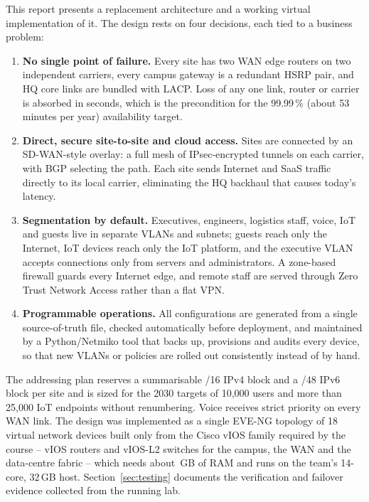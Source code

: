 \documentclass[11pt,a4paper]{article}
\newcounter{evid}
\begin{document}
This report presents a replacement architecture and a working virtual implementation of it. The design rests on four decisions, each tied to a business problem:

\begin{enumerate}
\item \textbf{No single point of failure.} Every site has two WAN edge routers on two independent carriers, every campus gateway is a redundant HSRP pair, and HQ core links are bundled with LACP. Loss of any one link, router or carrier is absorbed in seconds, which is the precondition for the 99.99\,\% (about 53 minutes per year) availability target.
\item \textbf{Direct, secure site-to-site and cloud access.} Sites are connected by an SD-WAN-style overlay: a full mesh of IPsec-encrypted tunnels on each carrier, with BGP selecting the path. Each site sends Internet and SaaS traffic directly to its local carrier, eliminating the HQ backhaul that causes today's latency.
\item \textbf{Segmentation by default.} Executives, engineers, logistics staff, voice, IoT and guests live in separate VLANs and subnets; guests reach only the Internet, IoT devices reach only the IoT platform, and the executive VLAN accepts connections only from servers and administrators. A zone-based firewall guards every Internet edge, and remote staff are served through Zero Trust Network Access rather than a flat VPN.
\item \textbf{Programmable operations.} All configurations are generated from a single source-of-truth file, checked automatically before deployment, and maintained by a Python/Netmiko tool that backs up, provisions and audits every device, so that new VLANs or policies are rolled out consistently instead of by hand.
\end{enumerate}

The addressing plan reserves a summarisable /16 IPv4 block and a /48 IPv6 block per site and is sized for the 2030 targets of 10,000 users and more than 25,000 IoT endpoints without renumbering. Voice receives strict priority on every WAN link. The design was implemented as a single EVE-NG topology of 18 virtual network devices built only from the Cisco vIOS family required by the course -- vIOS routers and vIOS-L2 switches for the campus, the WAN and the data-centre fabric -- which needs about \ramT\,GB of RAM and runs on the team's 14-core, 32\,GB host. Section~\ref{sec:testing} documents the verification and failover evidence collected from the running lab.
\end{document}
